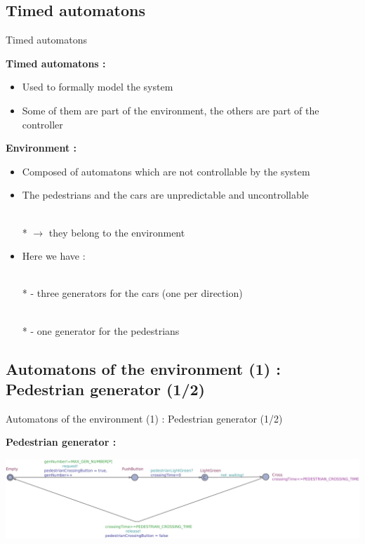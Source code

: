 \documentclass{bredelebeamer}
\begin{document}
\subsection{Timed automatons}

\begin{frame}{Timed automatons}


\textbf{Timed automatons : }

\begin{itemize}

\item Used to formally model the system

\item Some of them are part of the environment, the others are part of the controller

\end{itemize}


\textbf{Environment : }

\begin{itemize}

\item Composed of automatons which are not controllable by the system

\item The pedestrians and the cars are unpredictable and uncontrollable

\\* $\longrightarrow$ they belong to the environment

\item Here we have :

\\* - three generators for the cars (one per direction)

\\* - one generator for the pedestrians

\end{itemize}


\end{frame}


\subsection{Automatons of the environment (1) : Pedestrian generator (1/2) }

\begin{frame}{Automatons of the environment (1) : Pedestrian generator (1/2)}


\textbf{Pedestrian generator : }

\newline

\newline


\includegraphics[scale=0.20]{images/imagePedestrianGenerator.jpg}



\end{frame}
\end{document}
